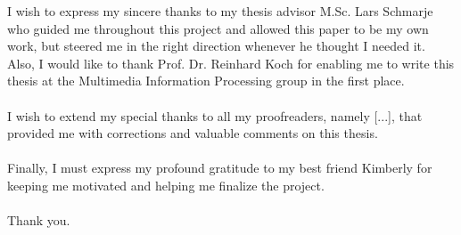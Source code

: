 
\begin{acknowledgements}      

    I wish to express my sincere thanks to my thesis advisor M.Sc. Lars Schmarje who guided me throughout this project and allowed this paper to be my own work, but steered me in the right direction whenever he thought I needed it. Also, I would like to thank Prof. Dr. Reinhard Koch for enabling me to write this thesis at the Multimedia Information Processing group in the first place.\\
    \\I wish to extend my special thanks to all my proofreaders, namely [...], that provided me with corrections and valuable comments on this thesis.\\
    \\Finally, I must express my profound gratitude to my best friend Kimberly for keeping me motivated and helping me finalize the project.\\
    \\Thank you. 


\end{acknowledgements}
